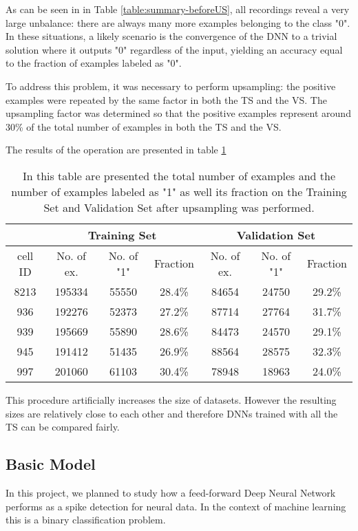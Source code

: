 As can be seen in in Table \ref{table:summary-beforeUS}, all recordings reveal a very large unbalance: there are always many more examples belonging to the class "0". In these situations, a likely scenario is the convergence of the DNN to a trivial solution where it outputs "0" regardless of the input, yielding an accuracy equal to the fraction of examples labeled as "0".

To address this problem, it was necessary to perform upsampling: the positive examples were repeated by the same factor in both the TS and the VS. The upsampling factor was determined so that the positive examples represent around 30\% of the total number of examples in both the TS and the VS.

The results of the operation are presented in table \ref{table:summary-afterUS}

\begin{table}[htbp]
\begin{center}
\begin{tabular}{c|ccc|ccc}
\multicolumn{1}{l|}{} & \multicolumn{ 3}{c|}{Training Set} & \multicolumn{ 3}{c}{Validation Set} \\ \hline
cell ID & No. of ex. & No. of "1" & Fraction & No. of ex. & No. of "1" & Fraction  \\ \hline
8213 & 195334 & 55550 & 28.4\% & 84654 & 24750 & 29.2\% \\ 
936 & 192276 & 52373 & 27.2\% & 87714 & 27764 & 31.7\% \\ 
939 & 195669 & 55890 & 28.6\% & 84473 & 24570 & 29.1\% \\ 
945 & 191412 & 51435 & 26.9\% & 88564 & 28575 & 32.3\% \\ 
997 & 201060 & 61103 & 30.4\% & 78948 & 18963 & 24.0\% \\ 
\end{tabular}
\end{center}
\caption{In this table are presented the total number of examples and the number of examples labeled as "1" as well its fraction on the Training Set and Validation Set after upsampling was performed. }
\label{table:summary-afterUS}
\end{table}

This procedure artificially increases the size of datasets. However the resulting sizes are relatively close to each other and therefore DNNs trained with all the TS can be compared fairly.

\subsection{Basic Model}
In this project, we planned to study how a feed-forward Deep Neural Network performs as a spike detection for neural data. In the context of machine learning this is a binary classification problem.

